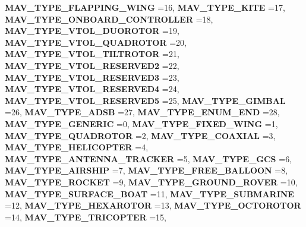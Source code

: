 \begin{DoxyCompactItemize}
\textbf{ M\+A\+V\+\_\+\+T\+Y\+P\+E\+\_\+\+F\+L\+A\+P\+P\+I\+N\+G\+\_\+\+W\+I\+NG} =16, 
\textbf{ M\+A\+V\+\_\+\+T\+Y\+P\+E\+\_\+\+K\+I\+TE} =17, 
\textbf{ M\+A\+V\+\_\+\+T\+Y\+P\+E\+\_\+\+O\+N\+B\+O\+A\+R\+D\+\_\+\+C\+O\+N\+T\+R\+O\+L\+L\+ER} =18, 
\textbf{ M\+A\+V\+\_\+\+T\+Y\+P\+E\+\_\+\+V\+T\+O\+L\+\_\+\+D\+U\+O\+R\+O\+T\+OR} =19, 
\newline
\textbf{ M\+A\+V\+\_\+\+T\+Y\+P\+E\+\_\+\+V\+T\+O\+L\+\_\+\+Q\+U\+A\+D\+R\+O\+T\+OR} =20, 
\textbf{ M\+A\+V\+\_\+\+T\+Y\+P\+E\+\_\+\+V\+T\+O\+L\+\_\+\+T\+I\+L\+T\+R\+O\+T\+OR} =21, 
\textbf{ M\+A\+V\+\_\+\+T\+Y\+P\+E\+\_\+\+V\+T\+O\+L\+\_\+\+R\+E\+S\+E\+R\+V\+E\+D2} =22, 
\textbf{ M\+A\+V\+\_\+\+T\+Y\+P\+E\+\_\+\+V\+T\+O\+L\+\_\+\+R\+E\+S\+E\+R\+V\+E\+D3} =23, 
\newline
\textbf{ M\+A\+V\+\_\+\+T\+Y\+P\+E\+\_\+\+V\+T\+O\+L\+\_\+\+R\+E\+S\+E\+R\+V\+E\+D4} =24, 
\textbf{ M\+A\+V\+\_\+\+T\+Y\+P\+E\+\_\+\+V\+T\+O\+L\+\_\+\+R\+E\+S\+E\+R\+V\+E\+D5} =25, 
\textbf{ M\+A\+V\+\_\+\+T\+Y\+P\+E\+\_\+\+G\+I\+M\+B\+AL} =26, 
\textbf{ M\+A\+V\+\_\+\+T\+Y\+P\+E\+\_\+\+A\+D\+SB} =27, 
\newline
\textbf{ M\+A\+V\+\_\+\+T\+Y\+P\+E\+\_\+\+E\+N\+U\+M\+\_\+\+E\+ND} =28, 
\textbf{ M\+A\+V\+\_\+\+T\+Y\+P\+E\+\_\+\+G\+E\+N\+E\+R\+IC} =0, 
\textbf{ M\+A\+V\+\_\+\+T\+Y\+P\+E\+\_\+\+F\+I\+X\+E\+D\+\_\+\+W\+I\+NG} =1, 
\textbf{ M\+A\+V\+\_\+\+T\+Y\+P\+E\+\_\+\+Q\+U\+A\+D\+R\+O\+T\+OR} =2, 
\newline
\textbf{ M\+A\+V\+\_\+\+T\+Y\+P\+E\+\_\+\+C\+O\+A\+X\+I\+AL} =3, 
\textbf{ M\+A\+V\+\_\+\+T\+Y\+P\+E\+\_\+\+H\+E\+L\+I\+C\+O\+P\+T\+ER} =4, 
\textbf{ M\+A\+V\+\_\+\+T\+Y\+P\+E\+\_\+\+A\+N\+T\+E\+N\+N\+A\+\_\+\+T\+R\+A\+C\+K\+ER} =5, 
\textbf{ M\+A\+V\+\_\+\+T\+Y\+P\+E\+\_\+\+G\+CS} =6, 
\newline
\textbf{ M\+A\+V\+\_\+\+T\+Y\+P\+E\+\_\+\+A\+I\+R\+S\+H\+IP} =7, 
\textbf{ M\+A\+V\+\_\+\+T\+Y\+P\+E\+\_\+\+F\+R\+E\+E\+\_\+\+B\+A\+L\+L\+O\+ON} =8, 
\textbf{ M\+A\+V\+\_\+\+T\+Y\+P\+E\+\_\+\+R\+O\+C\+K\+ET} =9, 
\textbf{ M\+A\+V\+\_\+\+T\+Y\+P\+E\+\_\+\+G\+R\+O\+U\+N\+D\+\_\+\+R\+O\+V\+ER} =10, 
\newline
\textbf{ M\+A\+V\+\_\+\+T\+Y\+P\+E\+\_\+\+S\+U\+R\+F\+A\+C\+E\+\_\+\+B\+O\+AT} =11, 
\textbf{ M\+A\+V\+\_\+\+T\+Y\+P\+E\+\_\+\+S\+U\+B\+M\+A\+R\+I\+NE} =12, 
\textbf{ M\+A\+V\+\_\+\+T\+Y\+P\+E\+\_\+\+H\+E\+X\+A\+R\+O\+T\+OR} =13, 
\textbf{ M\+A\+V\+\_\+\+T\+Y\+P\+E\+\_\+\+O\+C\+T\+O\+R\+O\+T\+OR} =14, 
\newline
\textbf{ M\+A\+V\+\_\+\+T\+Y\+P\+E\+\_\+\+T\+R\+I\+C\+O\+P\+T\+ER} =15, 

\end{DoxyCompactItemize}
